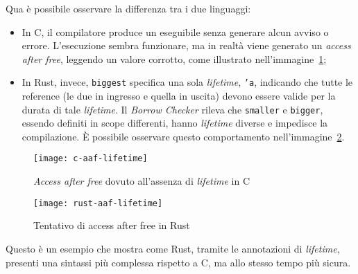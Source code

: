 Qua è possibile osservare la differenza tra i due linguaggi:
\begin{itemize}
    \item In C, il compilatore produce un eseguibile senza generare alcun avviso o errore. L'esecuzione sembra funzionare, ma in realtà viene generato un \textit{access after free}, leggendo un valore corrotto, come illustrato nell'immagine~\ref{c:aaf-lifetime};
    \item In Rust, invece, \texttt{biggest} specifica una sola \textit{lifetime}, \texttt{'a}, indicando che tutte le reference (le due in ingresso e quella in uscita) devono essere valide per la durata di tale \textit{lifetime}. Il \textit{Borrow Checker} rileva che \texttt{smaller} e \texttt{bigger}, essendo definiti in scope differenti, hanno \textit{lifetime} diverse e impedisce la compilazione. È possibile osservare questo comportamento nell'immagine~\ref{rust:aaf-lifetime}.
\end{itemize}
\begin{figure}[htbp]
    \begin{center}
        \texttt{[image: c-aaf-lifetime]}
        \caption{\textit{Access after free} dovuto all'assenza di \textit{lifetime} in C}\label{c:aaf-lifetime}
    \end{center}
\end{figure}
\begin{figure}[htbp]
    \begin{center}
        \texttt{[image: rust-aaf-lifetime]}
        \caption{Tentativo di {access after free} in Rust}\label{rust:aaf-lifetime}
    \end{center}
\end{figure}
Questo è un esempio che mostra come Rust, tramite le annotazioni di \textit{lifetime}, presenti una sintassi più complessa rispetto a C, ma allo stesso tempo più sicura.

